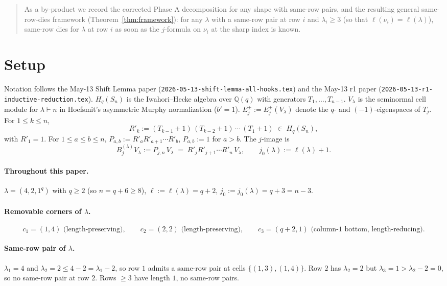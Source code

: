\documentclass[11pt]{article}
\theoremstyle{definition}
\begin{document}
\begin{abstract}
As a by-product we record the corrected Phase A decomposition for any
shape with same-row pairs, and the resulting general same-row-dies
framework
(Theorem~\ref{thm:framework}): for any $\lambda$ with a same-row
pair at row $i$ and $\lambda_i \ge 3$ (so that $\ell(\nu_i) = \ell(\lambda)$),
same-row dies for $\lambda$ at row $i$ as soon as the $j$-formula on
$\nu_i$ at the sharp index is known.

\end{abstract}

\section{Setup}\label{sec:setup}

Notation follows the May-13 Shift Lemma paper
(\texttt{2026-05-13-shift-lemma-all-hooks.tex}) and the May-13 r1
paper (\texttt{2026-05-13-r1-inductive-reduction.tex}).
$H_q(S_n)$ is the Iwahori--Hecke algebra over $\mathbb{Q}(q)$ with
generators $T_1, \ldots, T_{n-1}$. $V_\lambda$ is the seminormal cell
module for $\lambda \vdash n$ in Hoefsmit's asymmetric Murphy
normalization ($b' = 1$). $E_j^\pm := E_j^\pm(V_\lambda)$ denote the
$q$- and $(-1)$-eigenspaces of $T_j$. For $1 \le k \le n$,
\[
   R'_k := (T_{k-1}{+}1)\,(T_{k-2}{+}1)\,\cdots\,(T_1{+}1)
   \;\in\; H_q(S_n),
\]
with $R'_1 = 1$. For $1 \le a \le b \le n$, $P_{a, b} := R'_a R'_{a+1}
\cdots R'_b$, $P_{a, b} := 1$ for $a > b$. The $j$-image is
\[
   B^{(\lambda)}_j V_\lambda := P_{j, n}\,V_\lambda
   \;=\; R'_j R'_{j+1} \cdots R'_n\,V_\lambda,
   \qquad
   j_0(\lambda) := \ell(\lambda) + 1.
\]

\paragraph{Throughout this paper.}
$\lambda = (4, 2, 1^q)$ with $q \ge 2$ (so $n = q + 6 \ge 8$),
$\ell := \ell(\lambda) = q + 2$,
$j_0 := j_0(\lambda) = q + 3 = n - 3$.

\paragraph{Removable corners of $\lambda$.}
\[
   c_1 = (1, 4) \text{ (length-preserving)},
   \qquad
   c_2 = (2, 2) \text{ (length-preserving)},
   \qquad
   c_3 = (q + 2, 1) \text{ (column-1 bottom, length-reducing)}.
\]

\paragraph{Same-row pair of $\lambda$.}
$\lambda_1 = 4$ and $\lambda_2 = 2 \le 4 - 2 = \lambda_1 - 2$, so row
$1$ admits a same-row pair at cells $\{(1, 3), (1, 4)\}$. Row $2$ has
$\lambda_2 = 2$ but $\lambda_3 = 1 > \lambda_2 - 2 = 0$, so no
same-row pair at row $2$. Rows $\ge 3$ have length $1$, no same-row
pairs.
\end{document}
